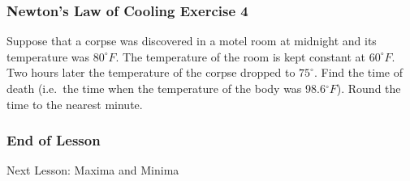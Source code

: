 \documentclass[xcolor=dvipsnames]{beamer}
\begin{document}
\begin{frame}
  \frametitle{Newton's Law of Cooling Exercise 4}
  Suppose that a corpse was discovered in a motel room at midnight and
  its temperature was $80^{\circ}F$. The temperature of the room is
  kept constant at $60^{\circ}F$. Two hours later the temperature of
  the corpse dropped to $75^{\circ}$. Find the time of death (i.e.\
  the time when the temperature of the body was 98.6$^{\circ}F$).
  Round the time to the nearest minute.
\end{frame}

\begin{frame}
  \frametitle{End of Lesson}
Next Lesson: Maxima and Minima
\end{frame}
\end{document}
